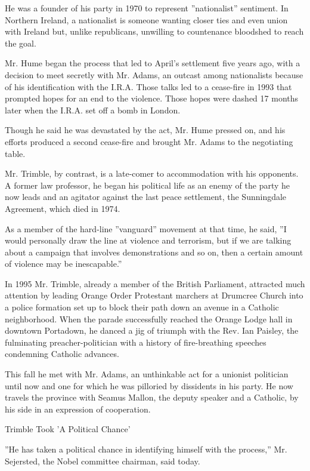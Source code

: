 He was a founder of his party in 1970 to represent ''nationalist''
sentiment. In Northern Ireland, a nationalist is someone wanting closer
ties and even union with Ireland but, unlike republicans, unwilling to
countenance bloodshed to reach the goal.

Mr. Hume began the process that led to April's settlement five years
ago, with a decision to meet secretly with Mr. Adams, an outcast among
nationalists because of his identification with the I.R.A. Those talks
led to a cease-fire in 1993 that prompted hopes for an end to the
violence. Those hopes were dashed 17 months later when the I.R.A. set
off a bomb in London.

Though he said he was devastated by the act, Mr. Hume pressed on, and
his efforts produced a second cease-fire and brought Mr. Adams to the
negotiating table.

Mr. Trimble, by contrast, is a late-comer to accommodation with his
opponents. A former law professor, he began his political life as an
enemy of the party he now leads and an agitator against the last peace
settlement, the Sunningdale Agreement, which died in 1974.

As a member of the hard-line ''vanguard'' movement at that time, he
said, ''I would personally draw the line at violence and terrorism, but
if we are talking about a campaign that involves demonstrations and so
on, then a certain amount of violence may be inescapable.''

In 1995 Mr. Trimble, already a member of the British Parliament,
attracted much attention by leading Orange Order Protestant marchers at
Drumcree Church into a police formation set up to block their path down
an avenue in a Catholic neighborhood. When the parade successfully
reached the Orange Lodge hall in downtown Portadown, he danced a jig of
triumph with the Rev. Ian Paisley, the fulminating preacher-politician
with a history of fire-breathing speeches condemning Catholic advances.

This fall he met with Mr. Adams, an unthinkable act for a unionist
politician until now and one for which he was pilloried by dissidents in
his party. He now travels the province with Seamus Mallon, the deputy
speaker and a Catholic, by his side in an expression of cooperation.

Trimble Took 'A Political Chance'

''He has taken a political chance in identifying himself with the
process,'' Mr. Sejersted, the Nobel committee chairman, said today.

